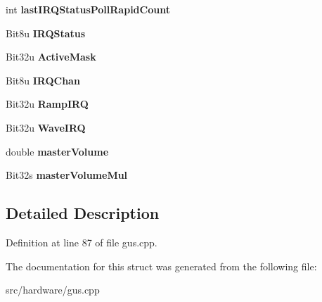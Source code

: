 \begin{DoxyCompactItemize}
\item 
\hypertarget{structGFGus_a7cf53be90ec9d8dfb4b22b3e004fd9cd}{int {\bfseries last\-I\-R\-Q\-Status\-Poll\-Rapid\-Count}}\label{structGFGus_a7cf53be90ec9d8dfb4b22b3e004fd9cd}

\item 
\hypertarget{structGFGus_af238c9e873d19d61f046063d83f111d1}{Bit8u {\bfseries I\-R\-Q\-Status}}\label{structGFGus_af238c9e873d19d61f046063d83f111d1}

\item 
\hypertarget{structGFGus_a2d78af798c38826042b4c8ef23ebe32f}{Bit32u {\bfseries Active\-Mask}}\label{structGFGus_a2d78af798c38826042b4c8ef23ebe32f}

\item 
\hypertarget{structGFGus_a4dcb3649a667a97aede4f09ded0ace2a}{Bit8u {\bfseries I\-R\-Q\-Chan}}\label{structGFGus_a4dcb3649a667a97aede4f09ded0ace2a}

\item 
\hypertarget{structGFGus_a6020128163cdd56bbb231a5c07630e24}{Bit32u {\bfseries Ramp\-I\-R\-Q}}\label{structGFGus_a6020128163cdd56bbb231a5c07630e24}

\item 
\hypertarget{structGFGus_aa5d5f4fadf04254e2d7d4c1e5b3ccffc}{Bit32u {\bfseries Wave\-I\-R\-Q}}\label{structGFGus_aa5d5f4fadf04254e2d7d4c1e5b3ccffc}

\item 
\hypertarget{structGFGus_a50fa87ed4026d42ccc1c854c0eab9c65}{double {\bfseries master\-Volume}}\label{structGFGus_a50fa87ed4026d42ccc1c854c0eab9c65}

\item 
\hypertarget{structGFGus_afaf9a55f59d75debcd2e17daf022fac6}{Bit32s {\bfseries master\-Volume\-Mul}}\label{structGFGus_afaf9a55f59d75debcd2e17daf022fac6}

\end{DoxyCompactItemize}


\subsection{Detailed Description}


Definition at line 87 of file gus.\-cpp.



The documentation for this struct was generated from the following file\-:\begin{DoxyCompactItemize}
\item 
src/hardware/gus.\-cpp\end{DoxyCompactItemize}
